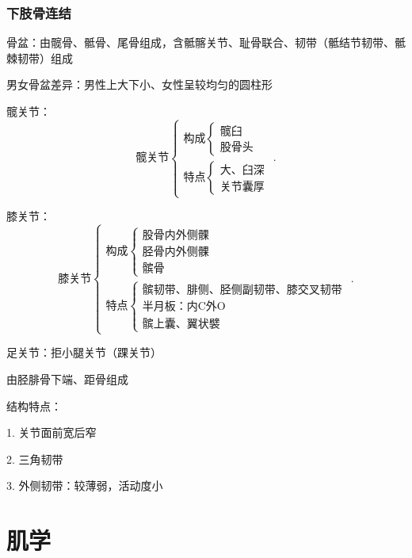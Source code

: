 \subsubsection{下肢骨连结}%
\label{subsub:下肢骨连结}	
\begin{notation}
	骨盆：由髋骨、骶骨、尾骨组成，含骶髂关节、耻骨联合、韧带（骶结节韧带、骶棘韧带）组成

	男女骨盆差异：男性上大下小、女性呈较均匀的圆柱形
\end{notation}
\begin{notation}
	髋关节：
	\[
		\text{髋关节}
		\begin{cases}
			\text{构成}\begin{cases}
				\text{髋臼}\\
				\text{股骨头}
			\end{cases}\\
			\text{特点}\begin{cases}
				\text{大、臼深}\\
				\text{关节囊厚}
			\end{cases}
		\end{cases}
	.\] 
\end{notation}
\begin{notation}
	膝关节：
	\[
		\text{膝关节}\begin{cases}
			\text{构成}\begin{cases}
				\text{股骨内外侧髁}\\
				\text{胫骨内外侧髁}\\
				\text{髌骨}
			\end{cases}\\
			\text{特点}\begin{cases}
				\text{髌韧带、腓侧、胫侧副韧带、膝交叉韧带}\\
				\text{半月板：内C外O}\\
				\text{髌上囊、翼状襞}
			\end{cases}
		\end{cases}
	.\] 
\end{notation}
\begin{notation}
	足关节：拒小腿关节（踝关节）

	由胫腓骨下端、距骨组成

	结构特点：

	1. 关节面前宽后窄

	2. 三角韧带

	3. 外侧韧带：较薄弱，活动度小
\end{notation}
\section{肌学}%
\label{sec:肌学}
